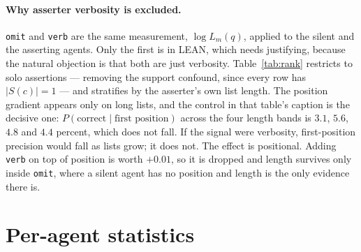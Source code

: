 \documentclass[11pt]{article}
\begin{document}
\paragraph{Why asserter verbosity is excluded.}
\texttt{omit} and \texttt{verb} are the same measurement, $\log L_m(q)$, applied to the silent and the asserting agents. Only the first is in LEAN, which needs justifying, because the natural objection is that both are just verbosity. Table~\ref{tab:rank} restricts to solo assertions --- removing the support confound, since every row has $|S(c)|=1$ --- and stratifies by the asserter's own list length. The position gradient appears only on long lists, and the control in that table's caption is the decisive one: $P(\mathrm{correct} \mid \text{first position})$ across the four length bands is $3.1$, $5.6$, $4.8$ and $4.4$ percent, which does not fall. If the signal were verbosity, first-position precision would fall as lists grow; it does not. The effect is positional. Adding \texttt{verb} on top of position is worth $+0.01$, so it is dropped and length survives only inside \texttt{omit}, where a silent agent has no position and length is the only evidence there is.

\section{Per-agent statistics}
\label{app:agents}
\end{document}

